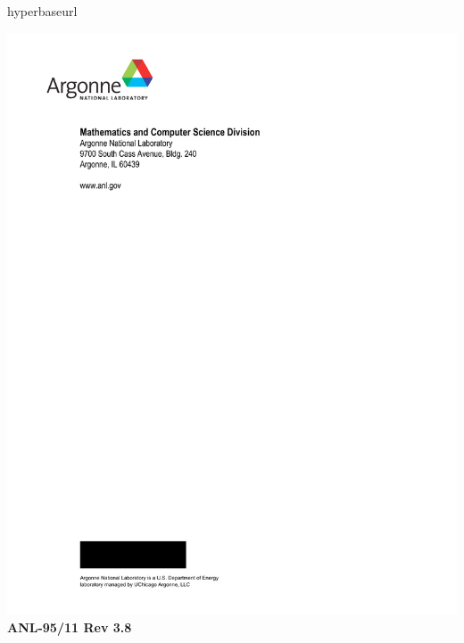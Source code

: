 %
%

hyperbaseurl

\makeindex

\def\design{\medskip \noindent Design Issue:\begin{em}}
\def\enddesign{\end{em} \medskip}


\def\shortintro{false}

\usepackage{fancyhdr,lastpage}
\pagestyle{fancy}





\pagestyle{empty}
\hspace{-.65in}\includegraphics{ArgonneLogo}
\hfill  {\large {\bf ANL-95/11 Rev 3.8}}

